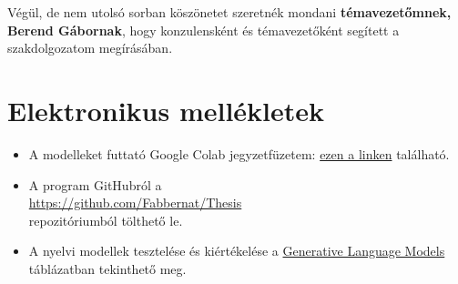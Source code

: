 \documentclass[12pt]{report}
\theoremstyle{definition}
\begin{document}
Végül, de nem utolsó sorban köszönetet szeretnék mondani \textbf{témavezetőmnek, Berend Gábornak}, hogy konzulensként és témavezetőként segített a szakdolgozatom megírásában.


% 
%











\chapter*{Elektronikus mellékletek}

\begin{itemize}
    \item
\label{att:colab}
A modelleket futtató Google Colab jegyzetfüzetem:
\href{https://colab.research.google.com/drive/1yA8IAd5z2oreKUXha-16Du2YrNhemNiU?usp=sharing}{ezen a linken}  található.
\item A program GitHubról a\\ \href{https://github.com/Fabbernat/Thesis}{https://github.com/Fabbernat/Thesis}\\ repozitóriumból tölthető le.
\item A nyelvi modellek tesztelése és kiértékelése a
\href{https://docs.google.com/spreadsheets/d/1y49lg52LHVFmTom-0ibCqYqWA1pKKhiUny-Pf3KVTIg/edit?usp=sharing}{Generative Language Models}
táblázatban tekinthető meg.
\end{itemize}
\end{document}
